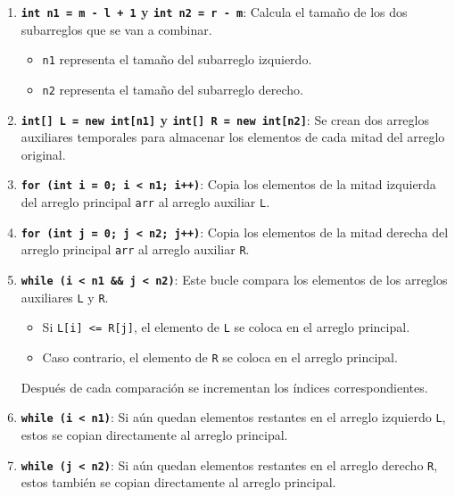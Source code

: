 \documentclass[
  spanish,
  letterpaper,
  DIV=11,
  numbers=noendperiod]{scrreprt}
\providecommand{\tightlist}{%
  \setlength{\itemsep}{0pt}\setlength{\parskip}{0pt}}
\begin{document}
\begin{enumerate}
\def\labelenumi{\arabic{enumi}.}
\item
  \textbf{\texttt{int\ n1\ =\ m\ -\ l\ +\ 1} y
  \texttt{int\ n2\ =\ r\ -\ m}}: Calcula el tamaño de los dos
  subarreglos que se van a combinar.

  \begin{itemize}
  \tightlist
  \item
    \texttt{n1} representa el tamaño del subarreglo izquierdo.
  \item
    \texttt{n2} representa el tamaño del subarreglo derecho.
  \end{itemize}
\item
  \textbf{\texttt{int{[}{]}\ L\ =\ new\ int{[}n1{]}} y
  \texttt{int{[}{]}\ R\ =\ new\ int{[}n2{]}}}: Se crean dos arreglos
  auxiliares temporales para almacenar los elementos de cada mitad del
  arreglo original.
\item
  \textbf{\texttt{for\ (int\ i\ =\ 0;\ i\ \textless{}\ n1;\ i++)}}:
  Copia los elementos de la mitad izquierda del arreglo principal
  \texttt{arr} al arreglo auxiliar \texttt{L}.
\item
  \textbf{\texttt{for\ (int\ j\ =\ 0;\ j\ \textless{}\ n2;\ j++)}}:
  Copia los elementos de la mitad derecha del arreglo principal
  \texttt{arr} al arreglo auxiliar \texttt{R}.
\item
  \textbf{\texttt{while\ (i\ \textless{}\ n1\ \&\&\ j\ \textless{}\ n2)}}:
  Este bucle compara los elementos de los arreglos auxiliares \texttt{L}
  y \texttt{R}.

  \begin{itemize}
  \tightlist
  \item
    Si \texttt{L{[}i{]}\ \textless{}=\ R{[}j{]}}, el elemento de
    \texttt{L} se coloca en el arreglo principal.
  \item
    Caso contrario, el elemento de \texttt{R} se coloca en el arreglo
    principal.
  \end{itemize}

  Después de cada comparación se incrementan los índices
  correspondientes.
\item
  \textbf{\texttt{while\ (i\ \textless{}\ n1)}}: Si aún quedan elementos
  restantes en el arreglo izquierdo \texttt{L}, estos se copian
  directamente al arreglo principal.
\item
  \textbf{\texttt{while\ (j\ \textless{}\ n2)}}: Si aún quedan elementos
  restantes en el arreglo derecho \texttt{R}, estos también se copian
  directamente al arreglo principal.
\end{enumerate}
\end{document}
